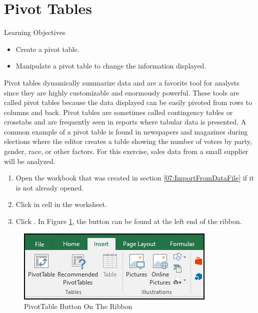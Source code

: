 \section{Pivot Tables}

\begin{center}
	\begin{objbox}{Learning Objectives}
		\begin{itemize}
			\setlength{\itemsep}{0pt}
			\setlength{\parskip}{0pt}
			\setlength{\parsep}{0pt}

			\item Create a pivot table.
			\item Manipulate a pivot table to change the information displayed.
			
		\end{itemize}
	\end{objbox}
\end{center}

Pivot tables dynamically summarize data and are a favorite tool for analysts since they are highly customizable and enormously powerful. These tools are called pivot tables because the data displayed can be easily pivoted from rows to columns and back. Pivot tables are sometimes called contingency tables or crosstabs and are frequently seen in reports where tabular data is presented. A common example of a pivot table is found in newspapers and magazines during elections where the editor creates a table showing the number of voters by party, gender, race, or other factors. For this exercise, sales data from a small supplier will be analyzed.

\begin{enumerate}
	\item Open the  workbook that was created in section \ref{07:ImportFromDataFile} if it is not already opened.
	\item Click in cell  in the  worksheet.
	\item Click . In Figure \ref{07:fig11}, the  button can be found at the left end of the ribbon.
\end{enumerate}

\begin{figure}[H]
	\centering
	\includegraphics[width=\maxwidth{.75\linewidth}]{gfx/ch07_fig11}
	\caption{PivotTable Button On The Ribbon}
	\label{07:fig11}
\end{figure}


